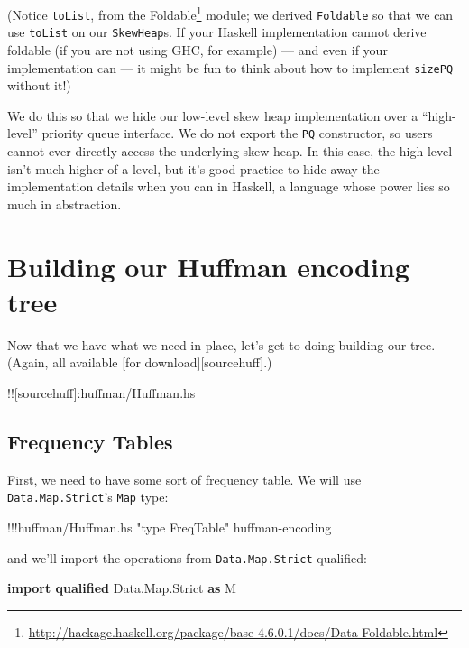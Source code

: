 \documentclass[]{article}
\newenvironment{Shaded}{}{}
\newcommand{\KeywordTok}[1]{\textcolor[rgb]{0.00,0.44,0.13}{\textbf{{#1}}}}
\newcommand{\DataTypeTok}[1]{\textcolor[rgb]{0.56,0.13,0.00}{{#1}}}
\newcommand{\StringTok}[1]{\textcolor[rgb]{0.25,0.44,0.63}{{#1}}}
\newcommand{\FunctionTok}[1]{\textcolor[rgb]{0.02,0.16,0.49}{{#1}}}
\newcommand{\NormalTok}[1]{{#1}}
\renewcommand{\href}[2]{#2\footnote{\url{#1}}}
\begin{document}
(Notice \texttt{toList}, from the
\href{http://hackage.haskell.org/package/base-4.6.0.1/docs/Data-Foldable.html}{Foldable}
module; we derived \texttt{Foldable} so that we can use \texttt{toList}
on our \texttt{SkewHeap}s. If your Haskell implementation cannot derive
foldable (if you are not using GHC, for example) --- and even if your
implementation can --- it might be fun to think about how to implement
\texttt{sizePQ} without it!)

We do this so that we hide our low-level skew heap implementation over a
``high-level'' priority queue interface. We do not export the
\texttt{PQ} constructor, so users cannot ever directly access the
underlying skew heap. In this case, the high level isn't much higher of
a level, but it's good practice to hide away the implementation details
when you can in Haskell, a language whose power lies so much in
abstraction.

\section{Building our Huffman encoding
tree}\label{building-our-huffman-encoding-tree}

Now that we have what we need in place, let's get to doing building our
tree. (Again, all available {[}for download{]}{[}sourcehuff{]}.)

!!{[}sourcehuff{]}:huffman/Huffman.hs

\subsection{Frequency Tables}\label{frequency-tables}

First, we need to have some sort of frequency table. We will use
\texttt{Data.Map.Strict}'s \texttt{Map} type:

\begin{Shaded}
\begin{Highlighting}[]
\FunctionTok{!!!}\NormalTok{huffman}\FunctionTok{/}\NormalTok{Huffman.hs }\StringTok{"type FreqTable"} \NormalTok{huffman}\FunctionTok{-}\NormalTok{encoding}
\end{Highlighting}
\end{Shaded}

and we'll import the operations from \texttt{Data.Map.Strict} qualified:

\begin{Shaded}
\begin{Highlighting}[]
\KeywordTok{import qualified} \DataTypeTok{Data.Map.Strict} \KeywordTok{as} \DataTypeTok{M}
\end{Highlighting}
\end{Shaded}
\end{document}
